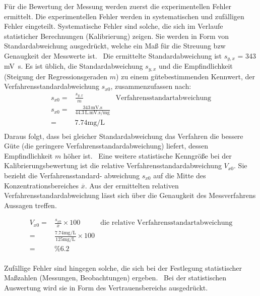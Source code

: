 \documentclass{article}
\begin{document}
%
%

\noindent
{}
Für die Bewertung der Messung werden zuerst die experimentellen Fehler ermittelt.
Die experimentellen Fehler werden in systematischen und zufälligen Fehler eingeteilt.
Systematische Fehler sind solche, die sich im Verlaufe statisticher Berechnungen (Kalibrierung) zeigen.
Sie werden in Form von Standardabweichung ausgedrückt, welche ein Maß für die Streuung bzw Genaugkeit der Messwerte ist.~\supercite{estatistik}
 Die ermittelte Standardabweichung ist $s_{y,x}$ = 343 \si{\milli\volt.\second}.
 Es ist üblich, die Standardabweichung $s_{y,x}$ und die Empfindlichkeit (Steigung der
Regressionsgeraden $m$) zu einem gütebestimmenden Kennwert, der Verfahrensstandardabweichung
$s_{x0}$, zusammenzufassen nach:
 \begin{align*}
     s_{x0}=&\frac{s_{y,x}}{m} & \text{Verfahrensstandartabweichung} \\
s_{x0}=&\frac{343 \, \si{\milli\volt.\second}}{44.3 \, \si{\liter.\milli\volt.\second\per\milli\gram}}&\\
 =& 7.74 \si{\milli\gram\per\liter}& \\
  \end{align*}
  Daraus folgt, dass bei gleicher Standardabweichung das Verfahren die bessere
Güte (die geringere Verfahrensstandardabweichung) liefert, dessen Empfindlichkeit $m$
höher ist.~\supercite{statistik}
  Eine weitere statistische Kenngröße bei der Kalibrierungsbewertung ist
die relative Verfahrensstandardabweichung $V_{x0}$. Sie bezieht die Verfahrensstandard-
abweichung $s_{x0}$ auf die Mitte des Konzentrationsbereiches $\overline{x}$.
Aus der ermittelten relativen Verfahrensstandardabweichung lässt sich über die Genaugkeit des Messverfahrens Aussagen treffen.

  \begin{align*}
 V_{x0}=&\frac{s_{x0}}{\overline{x}}\times 100 &\text{die relative Verfahrensstandartabweichung}\\
 = &\frac{7.74 \si{\milli\gram\per\liter}}{125 \si{\milli\gram\per\liter}}\times 100 & \\
 =& \%6.2 &\\
   \end{align*}

Zufällige Fehler sind hingegen solche, die sich bei der Festlegung statistischer Maßzahlen
(Messungen, Beobachtungen) ergeben.~\supercite{estatistik}
Bei der statistischen Auswertung wird sie in Form des Vertrauensbereichs ausgedrückt.
\end{document}
